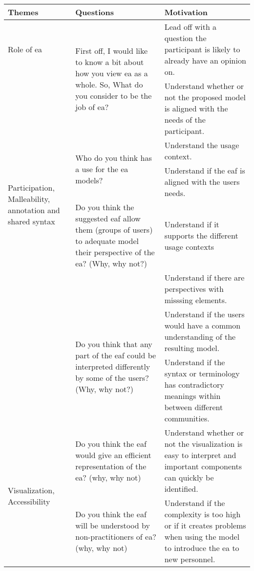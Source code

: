 {\centering
\begin{longtable}{|p{2.3cm}|p{4.5cm}|p{5cm}|}
    \hline
        Themes & Questions & Motivation\\ \hline
        \multirow{1}{2.3cm}{Role of \gls{ea}} 
            & \multirow{2}{4.5cm}{First off, I would like to know a bit about how you view \gls{ea} as a whole. So, What do you consider to be the job of \gls{ea}?} & Lead off with a question the participant is likely to already have an opinion on. \\ \cline{3-3}
            & & Understand whether or not the proposed model is aligned with the needs of the participant. \\
        \hline
        \multirow{3}{2.3cm}{Participation,  Malleability, annotation and shared syntax} 
            & \multirow{2}{4.5cm}{Who do you think has a use for the \gls{ea} models?} & Understand the usage context. \\ \cline{3-3}
            & & Understand if the \gls{eaf} is aligned with the users needs. \\ \cline{2-3}
            & \multirow{1}{4.5cm}{Do you think the suggested \gls{eaf} allow them (groups of users) to adequate model their perspective of the \gls{ea}? (Why, why not?)} & Understand if it supports the different usage contexts \\ \cline{3-3}
            & & Understand if there are perspectives with misssing elements. \\ \cline{2-3}
            & \multirow{2}{4.5cm}{Do you think that any part of the \gls{eaf} could be interpreted differently by some of the users? (Why, why not?)} & Understand if the users would have a common understanding of the resulting model. \\ \cline{3-3}
            & & Understand if the syntax or terminology has contradictory meanings within between different communities. \\
        \hline
        \multirow{2}{2.3cm}{Visualization, Accessibility} 
            & \multirow{1}{4.5cm}{Do you think the \gls{eaf} would give an efficient representation of the \gls{ea}? (why, why not)} & Understand whether or not the visualization is easy to interpret and important components can quickly be identified. \\ \cline{2-3}
            & \multirow{1}{4.5cm}{Do you think the \gls{eaf} will be understood by non-practitioners of \gls{ea}? (why, why not)} & Understand if the complexity is too high or if it creates problems when using the model to introduce the \gls{ea} to new personnel. \\

\end{longtable}}
